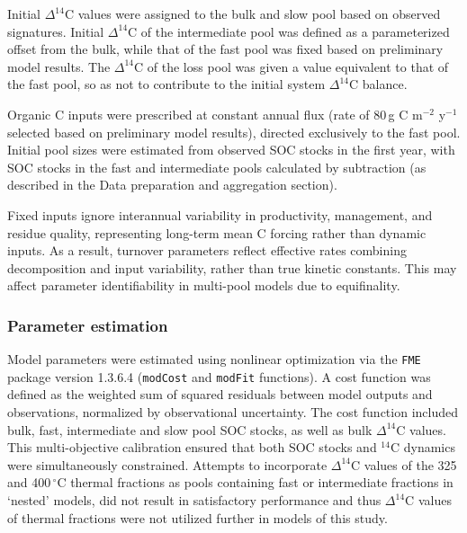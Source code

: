 \documentclass[bg, manuscript]{copernicus}
\begin{document}
Initial $\Delta^{14}\text{C}$ values were assigned to the bulk and slow pool based on observed signatures. Initial $\Delta^{14}\text{C}$ of the intermediate pool was defined as a parameterized offset from the bulk, while that of the fast pool was fixed based on preliminary model results. The $\Delta^{14}\text{C}$ of the loss pool was given a value equivalent to that of the fast pool, so as not to contribute to the initial system $\Delta^{14}\text{C}$ balance.

Organic C inputs were prescribed at constant annual flux (rate of 80\,g C m$^{-2}$ y$^{-1}$ selected based on preliminary model results), directed exclusively to the fast pool. Initial pool sizes were estimated from observed SOC stocks in the first year, with SOC stocks in the fast and intermediate pools calculated by subtraction (as described in the Data preparation and aggregation section).

Fixed inputs ignore interannual variability in productivity, management, and residue quality, representing long-term mean C forcing rather than dynamic inputs. As a result, turnover parameters reflect effective rates combining decomposition and input variability, rather than true kinetic constants. This may affect parameter identifiability in multi-pool models due to equifinality.

\subsubsection{Parameter estimation}
Model parameters were estimated using nonlinear optimization via the \texttt{FME} package version 1.3.6.4 (\texttt{modCost} and \texttt{modFit} functions). A cost function was defined as the weighted sum of squared residuals between model outputs and observations, normalized by observational uncertainty. The cost function included bulk, fast, intermediate and slow pool SOC stocks, as well as bulk $\Delta^{14}\text{C}$ values. This multi-objective calibration ensured that both SOC stocks and $^{14}\text{C}$ dynamics were simultaneously constrained. Attempts to incorporate $\Delta^{14}\text{C}$ values of the 325 and 400\,$^\circ\text{C}$ thermal fractions as pools containing fast or intermediate fractions in ‘nested’ models, did not result in satisfactory performance and thus $\Delta^{14}\text{C}$ values of thermal fractions were not utilized further in models of this study.
\end{document}

